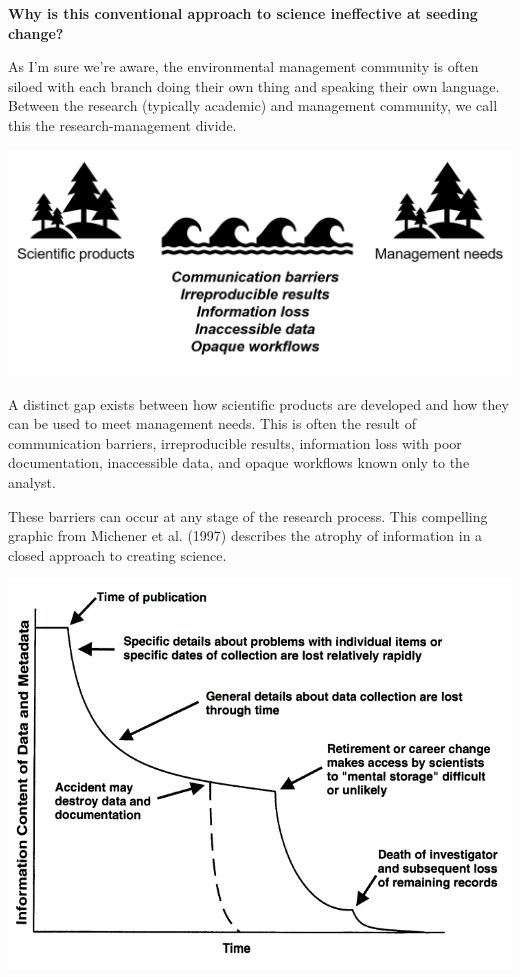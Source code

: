 \documentclass[
  letterpaper,
  DIV=11,
  numbers=noendperiod]{scrreprt}
\begin{document}
\textbf{Why is this conventional approach to science ineffective at
seeding change?}

As I'm sure we're aware, the environmental management community is often
siloed with each branch doing their own thing and speaking their own
language. Between the research (typically academic) and management
community, we call this the research-management divide.

\includegraphics{./img/divide2.png}

A distinct gap exists between how scientific products are developed and
how they can be used to meet management needs. This is often the result
of communication barriers, irreproducible results, information loss with
poor documentation, inaccessible data, and opaque workflows known only
to the analyst.

These barriers can occur at any stage of the research process. This
compelling graphic from Michener et al. (1997) describes the atrophy of
information in a closed approach to creating science.

\includegraphics{./img/michener.png}
\end{document}
